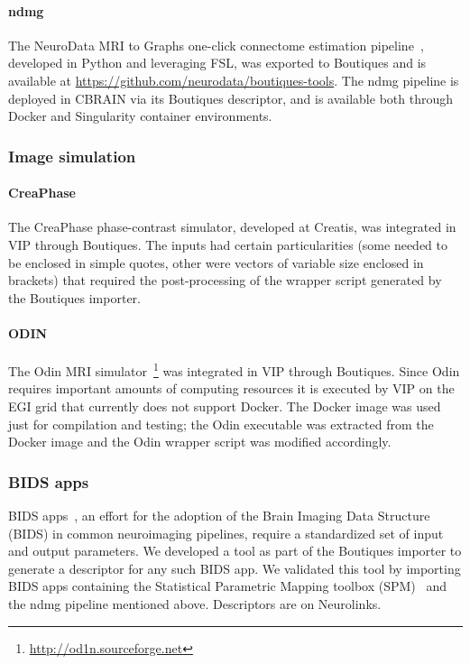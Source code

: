 \documentclass[a4paper,num-refs]{oup-contemporary}
\newcommand{\boutiques}{Boutiques\xspace}
\begin{document}
\paragraph{ndmg} The NeuroData MRI to Graphs one-click connectome estimation
pipeline~\cite{kiar2017comprehensive}, developed in Python and leveraging FSL, was
exported to \boutiques and is available at \url{https://github.com/neurodata/boutiques-tools}.
The ndmg pipeline is deployed in CBRAIN via its \boutiques descriptor, and is available
both through Docker and Singularity container environments.

\subsubsection{Image simulation}

\paragraph{CreaPhase}
The CreaPhase phase-contrast simulator, developed at
Creatis, was integrated in VIP through \boutiques. The inputs had
certain particularities (some needed to be enclosed in simple quotes,
other were vectors of variable size enclosed in brackets) that
required the post-processing of the wrapper script generated by the
\boutiques importer.

\paragraph{ODIN} The Odin MRI simulator~\cite{jochimsen2004odin}\footnote{\url{http://od1n.sourceforge.net}} was integrated
in VIP through \boutiques. Since Odin requires important amounts of
computing resources it is executed by VIP on the EGI grid that
currently does not support Docker. The Docker image was used just for
compilation and testing; the Odin executable was extracted from the
Docker image and the Odin wrapper script was modified accordingly.

\subsubsection{BIDS apps}

BIDS apps~\cite{gorgolewski2017bids}, an effort for the adoption of
the Brain Imaging Data Structure (BIDS) in common neuroimaging
pipelines, require a standardized set of input and output
parameters. We developed a tool as part of the \boutiques importer to
generate a descriptor for any such BIDS app. We validated this tool by
importing BIDS apps containing the Statistical Parametric Mapping
toolbox (SPM)~\cite{penny2011statistical} and the ndmg pipeline
mentioned above. Descriptors are on Neurolinks.
\end{document}
